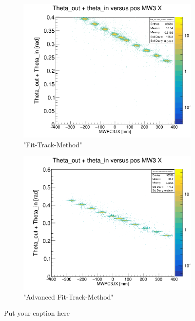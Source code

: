 \documentclass[12pt, letterpaper]{article}
\begin{document}
\begin{figure}[!htbp]
\begin{subfigure}{.5\textwidth}
  \label{fig:sub-second}
\end{subfigure}
\begin{subfigure}{.5\textwidth}
  \centering
  \includegraphics[width=.9\linewidth]{plot_imgs/theta_out_theta_in_mw3_fit.png} 
  \caption{"Fit-Track-Method"}
  \label{fig:sub-second}
\end{subfigure}
\begin{subfigure}{.5\textwidth}
  \centering
  \includegraphics[width=.9\linewidth]{plot_imgs/theta_out_theta_in_mw3_last.png} 
  \caption{"Advanced Fit-Track-Method"}
  \label{fig:sub-second}
\end{subfigure}
\caption{Put your caption here}
\label{fig:fig}
\end{figure}
\FloatBarrier
\clearpage
\end{document}
